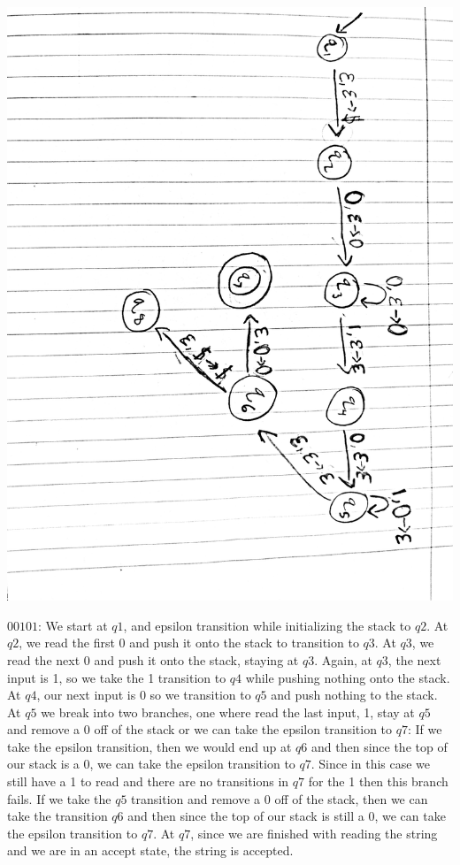 \documentclass[11pt]{article}
\theoremstyle{definition}
\theoremstyle{theorem}
\newcommand{\solution}{\medskip\noindent{\color{blue}\textbf{Solution:}}}
\begin{document}
\begin{enumerate}[label=(\alph*)]
\solution 

\includegraphics[angle=90,origin=c, scale=0.15]{./p3/hwp3.jpg}


$00101$: We start at $q1$, and epsilon transition while initializing the stack to $q2$. At $q2$, we read the first 0 and push it onto the stack to transition to $q3$. At $q3$, we read the next 0 and push it onto the stack, staying at $q3$. Again, at $q3$, the next input is 1, so we take the 1 transition to $q4$ while pushing nothing onto the stack. At $q4$, our next input is 0 so we transition to $q5$ and push nothing to the stack.
At $q5$ we break into two branches, one where read the last input, 1, stay at $q5$ and remove a 0 off of the stack or we can take the epsilon transition to $q7$: 
If we take the epsilon transition, then we would end up at $q6$ and then since the top of our stack is a 0, we can take the epsilon transition to $q7$. Since in this case we still have a 1 to read and there are no transitions in $q7$ for the 1 then this branch fails.
If we take the $q5$ transition and remove a 0 off of the stack, then we can take the transition $q6$ and then since the top of our stack is still a 0, we can take the epsilon transition to $q7$. At $q7$, since we are finished with reading the string and we are in an accept state, the string is accepted. \\~\\


\end{enumerate}
\end{document}
